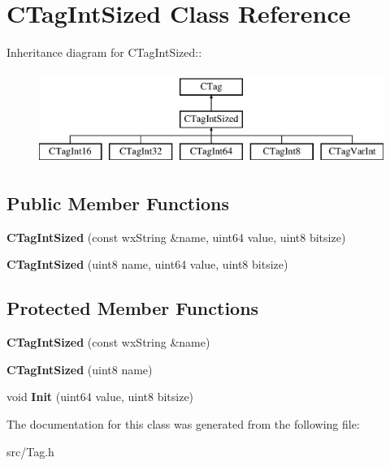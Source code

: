 \section{CTagIntSized Class Reference}
\label{classCTagIntSized}
Inheritance diagram for CTagIntSized::\begin{figure}[H]
\begin{center}
\leavevmode
\includegraphics[height=3cm]{classCTagIntSized}
\end{center}
\end{figure}
\subsection*{Public Member Functions}
\begin{DoxyCompactItemize}
\item 
{\bfseries CTagIntSized} (const wxString \&name, uint64 value, uint8 bitsize)\label{classCTagIntSized_a2ebf5d94a5ac516e6e9cf77d0da14778}

\item 
{\bfseries CTagIntSized} (uint8 name, uint64 value, uint8 bitsize)\label{classCTagIntSized_af6455aac30a714cb3831938b2eb21be5}

\end{DoxyCompactItemize}
\subsection*{Protected Member Functions}
\begin{DoxyCompactItemize}
\item 
{\bfseries CTagIntSized} (const wxString \&name)\label{classCTagIntSized_a8fb3bbf9926ac8db3eea15e680adcdda}

\item 
{\bfseries CTagIntSized} (uint8 name)\label{classCTagIntSized_ade97ced446d7f58ff2eb874a5f2357d3}

\item 
void {\bfseries Init} (uint64 value, uint8 bitsize)\label{classCTagIntSized_a7fa192b1ca4cf666b7556e8cc8c3a2ac}

\end{DoxyCompactItemize}


The documentation for this class was generated from the following file:\begin{DoxyCompactItemize}
\item 
src/Tag.h\end{DoxyCompactItemize}
